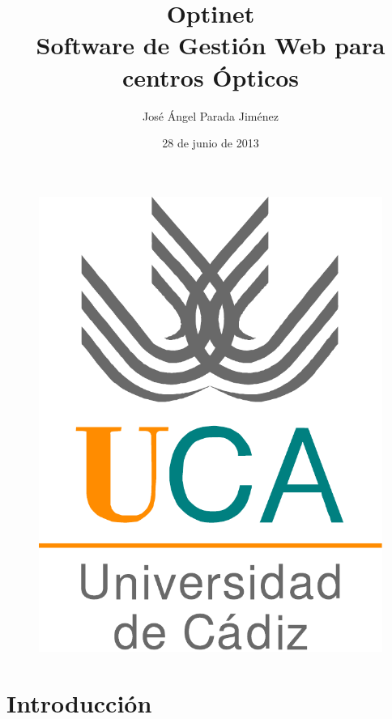 \documentclass[spanish,xcolor=table,svgnames]{beamer}
\title[Optinet: Software de Gestión Web para centros Ópticos]{Optinet \\ Software de Gestión Web para centros Ópticos}
\author{José Ángel Parada Jiménez}
\institute[UCA]{Ingeniería Técnica en Informática de Gestión \\ Universidad de Cádiz}
\date{28 de junio de 2013} %
\begin{document}
\begin{frame}
  \titlepage
  \begin{figure}
	\includegraphics[height=0.2\textheight]{logo_uca} 
  \end{figure}
\end{frame}


\section{Introducción}
\frame{\tableofcontents[currentsection]}
\end{document}
